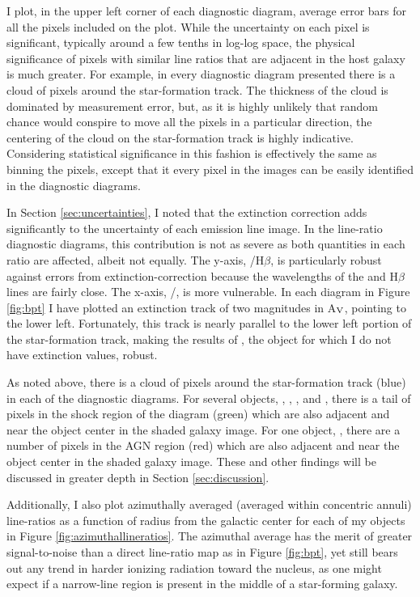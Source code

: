 I plot, in the upper left corner of each diagnostic diagram, average error bars for all the pixels included on the plot.  While the uncertainty on each pixel is significant, typically around a few tenths in log-log space, the physical significance of pixels with similar line ratios that are adjacent in the host galaxy is much greater.  For example, in every diagnostic diagram presented there is a cloud of pixels around the star-formation track.  The thickness of the cloud is dominated by measurement error, but, as it is highly unlikely that random chance would conspire to move all the pixels in a particular direction, the centering of the cloud on the star-formation track is highly indicative. Considering statistical significance in this fashion is effectively the same as binning the pixels, except that it every pixel in the images can be easily identified in the diagnostic diagrams.

In Section \ref{sec:uncertainties}, I noted that the extinction correction adds significantly to the uncertainty of each emission line image.  In the line-ratio diagnostic diagrams, this contribution is not as severe as both quantities in each ratio are affected, albeit not equally.  The y-axis, /H$\beta$, is particularly robust against errors from extinction-correction because the wavelengths of the  and H$\beta$ lines are fairly close.  The x-axis, /, is more vulnerable. In each diagram in Figure \ref{fig:bpt} I have plotted an extinction track of two magnitudes in A$_{\rm V}$, pointing to  the lower left.  Fortunately, this track is nearly parallel to the lower left portion of the star-formation track, making the results of , the object for which I do not have extinction values, robust.

As noted above, there is a cloud of pixels around the star-formation track (blue) in each of the diagnostic diagrams.  For several objects, , , , and , there is a tail of pixels in the shock region of the diagram (green) which are also adjacent and near the object center in the shaded galaxy image.  For one object, , there are a number of pixels in the AGN region (red) which are also adjacent and near the object center in the shaded galaxy image. These and other findings will be discussed in greater depth in Section \ref{sec:discussion}.

Additionally, I also plot azimuthally averaged (averaged within concentric annuli) line-ratios as a function of radius from the galactic center for each of my objects in Figure \ref{fig:azimuthallineratios}.  The azimuthal average has the merit of greater signal-to-noise than a direct line-ratio map as in Figure \ref{fig:bpt}, yet still bears out any trend in harder ionizing radiation toward the nucleus, as one might expect if a narrow-line region is present in the middle of a star-forming galaxy.

